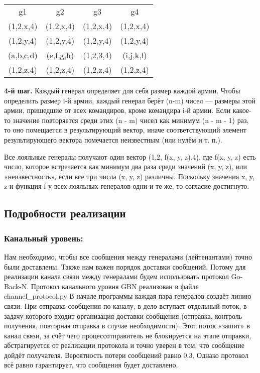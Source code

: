 \documentclass[a4paper,12pt]{article}
\begin{document}
\begin{table}[ht!]
    \begin{center}
        \begin{tabular}{cccc}
            g1 & g2 & g3 & g4 \\
            (1,2,x,4) & (1,2,x,4) & (1,2,x,4) & (1,2,x,4) \\
            (1,2,y,4) & (1,2,y,4) & (1,2,y,4) & (1,2,y,4) \\
            (a,b,c,d) & (e,f,g,h) & (1,2,3,4) & (i,j,k,l) \\
            (1,2,z,4) & (1,2,z,4) & (1,2,z,4) & (1,2,z,4) \\
        \end{tabular}
    \end{center}
\end{table}

\textbf{4-й шаг.} Каждый генерал определяет для себя размер каждой армии. Чтобы
определить размер i-й армии, каждый генерал берёт (n-m) чисел — размеры этой армии,
пришедшие от всех командиров, кроме командира i-й армии. Если какое-то значение
повторяется среди этих (n - m) чисел как минимум (n - m - 1) раз, то оно помещается в
результирующий вектор, иначе соответствующий элемент результирующего вектора
помечается неизвестным (или нулём и т. п.).

Все лояльные генералы получают один вектор (1,2, f(x, y, z),4), где f(x, y, z) есть
число, которое встречается как минимум два раза среди значений (x, y, z), или
«неизвестность», если все три числа (x, y, z) различны. Поскольку значения x, y, z и
функция f у всех лояльных генералов одни и те же, то согласие достигнуто.

\subsection{Подробности реализации}



\subsubsection{Канальный уровень:}

Нам необходимо, чтобы все сообщения между генералами (лейтенантами) точно
были доставлены. Также нам важен порядок доставки сообщений. Потому для реализации
канала связи между генералами будем использовать протокол Go-Back-N.
Протокол канального уровня GBN реализован в файле channel\_protocol.py
В начале программы каждая пара генералов создаёт линию связи. При отправке
сообщения по каналу, в дело вступает отдельный поток, в задачу которого входит
организация доставки сообщения (отправка, контроль получения, повторная отправка в
случае необходимости). Этот поток «зашит» в канал связи, за счёт чего процессотправитель не блокируется на этапе отправки, абстрагируется от реализации протокола и
точно уверен в том, что сообщение дойдёт получателя.
Вероятность потери сообщений равно 0.3. Однако протокол всё равно гарантирует,
что сообщения будет доставлено.
\end{document}
